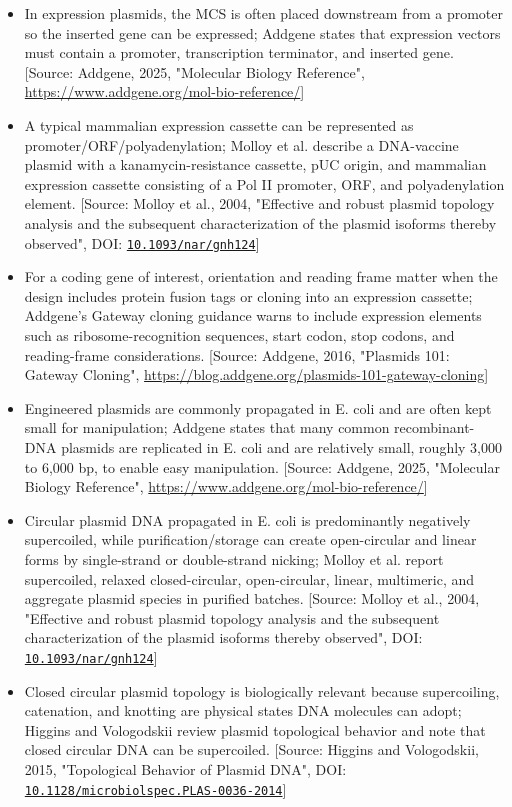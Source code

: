 \documentclass[11pt]{report}
\begin{document}
\begin{itemize}
\item In expression plasmids, the MCS is often placed downstream from a promoter so the inserted gene can be expressed; Addgene states that expression vectors must contain a promoter, transcription terminator, and inserted gene. [Source: Addgene, 2025, "Molecular Biology Reference", \url{https://www.addgene.org/mol-bio-reference/}]
\item A typical mammalian expression cassette can be represented as promoter/ORF/polyadenylation; Molloy et al. describe a DNA-vaccine plasmid with a kanamycin-resistance cassette, pUC origin, and mammalian expression cassette consisting of a Pol II promoter, ORF, and polyadenylation element. [Source: Molloy et al., 2004, "Effective and robust plasmid topology analysis and the subsequent characterization of the plasmid isoforms thereby observed", DOI: \href{https://doi.org/10.1093/nar/gnh124}{\nolinkurl{10.1093/nar/gnh124}}]
\item For a coding gene of interest, orientation and reading frame matter when the design includes protein fusion tags or cloning into an expression cassette; Addgene's Gateway cloning guidance warns to include expression elements such as ribosome-recognition sequences, start codon, stop codons, and reading-frame considerations. [Source: Addgene, 2016, "Plasmids 101: Gateway Cloning", \url{https://blog.addgene.org/plasmids-101-gateway-cloning}]
\item Engineered plasmids are commonly propagated in E. coli and are often kept small for manipulation; Addgene states that many common recombinant-DNA plasmids are replicated in E. coli and are relatively small, roughly 3,000 to 6,000 bp, to enable easy manipulation. [Source: Addgene, 2025, "Molecular Biology Reference", \url{https://www.addgene.org/mol-bio-reference/}]
\item Circular plasmid DNA propagated in E. coli is predominantly negatively supercoiled, while purification/storage can create open-circular and linear forms by single-strand or double-strand nicking; Molloy et al. report supercoiled, relaxed closed-circular, open-circular, linear, multimeric, and aggregate plasmid species in purified batches. [Source: Molloy et al., 2004, "Effective and robust plasmid topology analysis and the subsequent characterization of the plasmid isoforms thereby observed", DOI: \href{https://doi.org/10.1093/nar/gnh124}{\nolinkurl{10.1093/nar/gnh124}}]
\item Closed circular plasmid topology is biologically relevant because supercoiling, catenation, and knotting are physical states DNA molecules can adopt; Higgins and Vologodskii review plasmid topological behavior and note that closed circular DNA can be supercoiled. [Source: Higgins and Vologodskii, 2015, "Topological Behavior of Plasmid DNA", DOI: \href{https://doi.org/10.1128/microbiolspec.PLAS-0036-2014}{\nolinkurl{10.1128/microbiolspec.PLAS-0036-2014}}]

\end{itemize}
\end{document}

